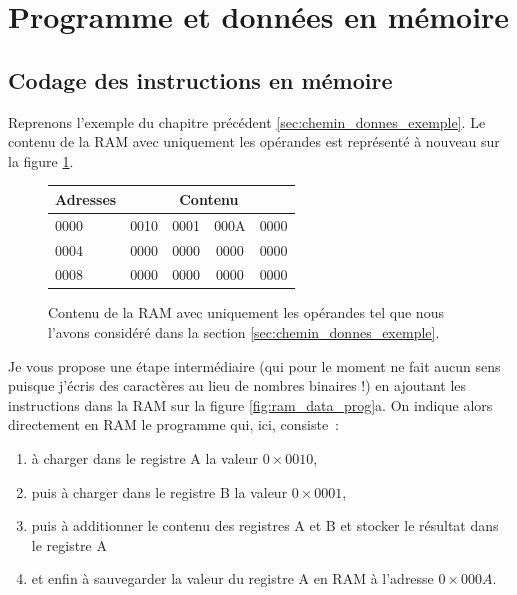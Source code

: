 \section{Programme et données en mémoire}




\subsection{Codage des instructions en mémoire}

Reprenons l'exemple du chapitre précédent \ref{sec:chemin_donnes_exemple}. Le contenu de la RAM avec uniquement les opérandes est représenté à nouveau sur la figure \ref{fig:ram_data_prog_op}. 

\begin{figure}[htbp]
\centering\begin{tabular}{l|cccc}
Adresses & \multicolumn{4}{c}{Contenu}\\
\hline
0000 & 0010 & 0001 & 000A & 0000\\
0004 & 0000 & 0000 & 0000 & 0000\\
0008 & 0000 & 0000 & 0000 & 0000
\end{tabular}
\caption{\label{fig:ram_data_prog_op} Contenu de la RAM avec uniquement les opérandes tel que nous l'avons considéré dans la section \ref{sec:chemin_donnes_exemple}.}
\end{figure}


Je vous propose une étape intermédiaire (qui pour le moment ne fait aucun sens puisque j'écris des caractères au lieu de nombres binaires !) en ajoutant les instructions dans la RAM sur la figure \ref{fig:ram_data_prog}a. On indique alors directement en RAM le programme qui, ici, consiste~:
\begin{enumerate}
\item à charger dans le registre A la valeur $0\times0010$,
\item puis à charger dans le registre B la valeur $0\times0001$,
\item puis à additionner le contenu des registres A et B et stocker le résultat dans le registre A
\item et enfin à sauvegarder la valeur du registre A en RAM à l'adresse $0\times000A$.
\end{enumerate}

